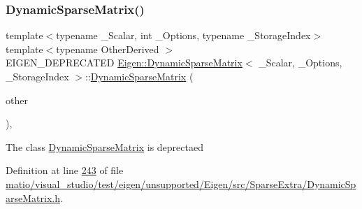 \mbox{\label{class_eigen_1_1_dynamic_sparse_matrix_ab5bd886d79beb30802df0b1508727482}} 
\subsubsection{\texorpdfstring{Dynamic\+Sparse\+Matrix()}{DynamicSparseMatrix()}\hspace{0.1cm}{\footnotesize\ttfamily [6/6]}}
{\footnotesize\ttfamily template$<$typename \+\_\+\+Scalar, int \+\_\+\+Options, typename \+\_\+\+Storage\+Index$>$ \\
template$<$typename Other\+Derived $>$ \\
E\+I\+G\+E\+N\+\_\+\+D\+E\+P\+R\+E\+C\+A\+T\+ED \hyperlink{class_eigen_1_1_dynamic_sparse_matrix}{Eigen\+::\+Dynamic\+Sparse\+Matrix}$<$ \+\_\+\+Scalar, \+\_\+\+Options, \+\_\+\+Storage\+Index $>$\+::\hyperlink{class_eigen_1_1_dynamic_sparse_matrix}{Dynamic\+Sparse\+Matrix} (\begin{DoxyParamCaption}\item[{const \hyperlink{group___sparse_core___module_class_eigen_1_1_sparse_matrix_base}{Sparse\+Matrix\+Base}$<$ Other\+Derived $>$ \&}]{other }\end{DoxyParamCaption})\hspace{0.3cm}{\ttfamily [inline]}, {\ttfamily [explicit]}}

The class \hyperlink{class_eigen_1_1_dynamic_sparse_matrix}{Dynamic\+Sparse\+Matrix} is deprectaed 

Definition at line \hyperlink{matio_2visual__studio_2test_2eigen_2unsupported_2_eigen_2src_2_sparse_extra_2_dynamic_sparse_matrix_8h_source_l00243}{243} of file \hyperlink{matio_2visual__studio_2test_2eigen_2unsupported_2_eigen_2src_2_sparse_extra_2_dynamic_sparse_matrix_8h_source}{matio/visual\+\_\+studio/test/eigen/unsupported/\+Eigen/src/\+Sparse\+Extra/\+Dynamic\+Sparse\+Matrix.\+h}.

\mbox{\label{class_eigen_1_1_dynamic_sparse_matrix_af0677c8aec1e1dee9f0a389509082a83}} 
